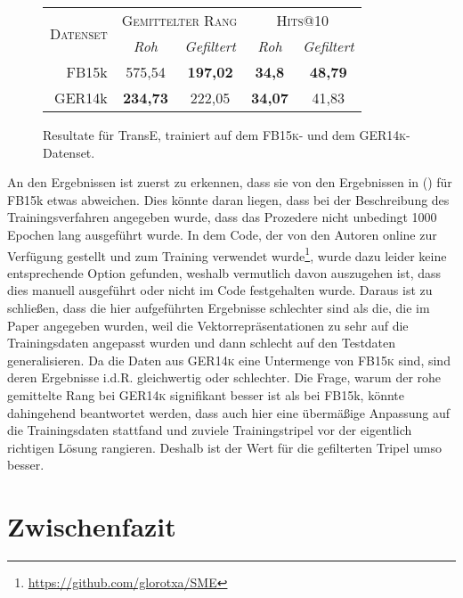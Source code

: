 \begin{figure}[h]
  \centering
  \begin{tabular}{r||cc|cc}
    \multirow{2}{*}{\textsc{Datenset}} & \multicolumn{2}{c|}{\textsc{Gemittelter Rang}} & \multicolumn{2}{c}{\textsc{Hits@10}} \\
     & \emph{Roh} & \emph{Gefiltert} & \emph{Roh} & \emph{Gefiltert} \\
     \hline
     FB15k & 575,54 & \textbf{197,02} & \textbf{34,8} & \textbf{48,79} \\
     GER14k & \textbf{234,73} & 222,05 & \textbf{34,07} & 41,83 \\

  \end{tabular}
  \caption[Resultate für TransE mit \textsc{FB15k} und \textsc{GER14k}]{Resultate für TransE, trainiert auf dem \textsc{FB15k}- und dem \textsc{GER14k}-Datenset.\label{fig:results1}}
\end{figure}

An den Ergebnissen ist zuerst zu erkennen, dass sie von den Ergebnissen in (\cite{bordes2013translating}) für FB15k etwas abweichen.
Dies könnte daran liegen, dass bei der Beschreibung des Trainingsverfahren angegeben wurde, dass das Prozedere
nicht unbedingt 1000 Epochen lang ausgeführt wurde. In dem Code, der von den Autoren online zur Verfügung gestellt und
zum Training verwendet wurde\footnote{\url{https://github.com/glorotxa/SME}}, wurde dazu leider keine entsprechende Option gefunden, weshalb vermutlich davon auszugehen
ist, dass dies manuell ausgeführt oder nicht im Code festgehalten wurde.
Daraus ist zu schließen, dass die hier aufgeführten Ergebnisse schlechter sind als die,
die im Paper angegeben wurden, weil die Vektorrepräsentationen zu sehr auf die Trainingsdaten angepasst wurden und dann schlecht
auf den Testdaten generalisieren. Da die Daten aus \textsc{GER14k} eine Untermenge von \textsc{FB15k} sind, sind deren Ergebnisse
i.d.R. gleichwertig oder schlechter. Die Frage, warum der rohe gemittelte Rang bei \textsc{GER14k} signifikant besser ist als
bei FB15k, könnte dahingehend beantwortet werden, dass auch hier eine übermäßige Anpassung auf die Trainingsdaten stattfand und
zuviele Trainingstripel vor der eigentlich richtigen Lösung rangieren. Deshalb ist der Wert für die gefilterten Tripel umso
besser.

\section{Zwischenfazit}

